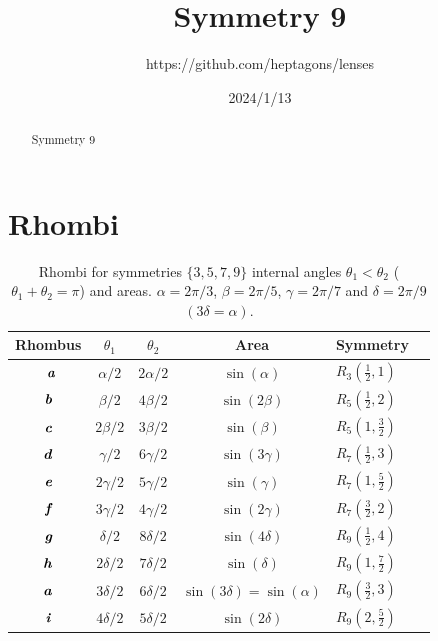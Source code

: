 \documentclass[11pt]{article}
\title{Symmetry 9}
\author{https://github.com/heptagons/lenses}
\date{2024/1/13}
\def\mathbi#1{\textbf{\em #1}}
\begin{document}
\maketitle
\begin{abstract}
Symmetry 9
\end{abstract}

\section{Rhombi}

\begin{table}[H]
\begin{center}
\begin{tabular}{|c|c c| c | l | c |}
\hline
Rhombus & $\theta_1$ & $\theta_2$ & Area & Symmetry \\ \hline\
$\mathbi{a}$ & $\alpha/2$ & $2\alpha/2$  & $\sin(\alpha)$  & $R_3(\frac{1}2,1)$ \\[0.5ex]
\hline
$\mathbi{b}$ & $\beta/2$ & $4\beta/2$    & $\sin(2\beta)$  & $R_5(\frac{1}2,2)$ \\[0.5ex]
$\mathbi{c}$ & $2\beta/2$ & $3\beta/2$   & $\sin(\beta)$   & $R_5(1,\frac{3}2)$ \\[0.5ex]
\hline
$\mathbi{d}$ & $\gamma/2$ & $6\gamma/2$  & $\sin(3\gamma)$ & $R_7(\frac{1}2,3)$ \\[0.5ex]
$\mathbi{e}$ & $2\gamma/2$ & $5\gamma/2$ & $\sin(\gamma)$  & $R_7(1,\frac{5}2)$ \\[0.5ex]
$\mathbi{f}$ & $3\gamma/2$ & $4\gamma/2$ & $\sin(2\gamma)$ & $R_7(\frac{3}2,2)$ \\[0.5ex]
\hline
$\mathbi{g}$ & $\delta/2$ & $8\delta/2$  & $\sin(4\delta)$ & $R_9(\frac{1}2,4)$ \\[0.5ex]
$\mathbi{h}$ & $2\delta/2$ & $7\delta/2$ & $\sin(\delta)$  & $R_9(1,\frac{7}2)$ \\[0.5ex]
$\mathbi{a}$ & $3\delta/2$ & $6\delta/2$ & $\sin(3\delta)=\sin(\alpha)$ & $R_9(\frac{3}2,3)$ \\[0.5ex]
$\mathbi{i}$ & $4\delta/2$ & $5\delta/2$ & $\sin(2\delta)$ & $R_9(2,\frac{5}2)$ \\[0.5ex]
\hline
\end{tabular}
\caption{Rhombi for symmetries $\{3,5,7,9\}$ internal angles $\theta_1 < \theta_2$ ($\theta_1 + \theta_2 = \pi$) and areas. $\alpha = 2\pi/3$, $\beta = 2\pi/5$, $\gamma = 2\pi/7$ and $\delta = 2\pi/9$ $(3\delta = \alpha)$.} 
\label{tbl:bc-angles}
\end{center}
\end{table}
\end{document}
